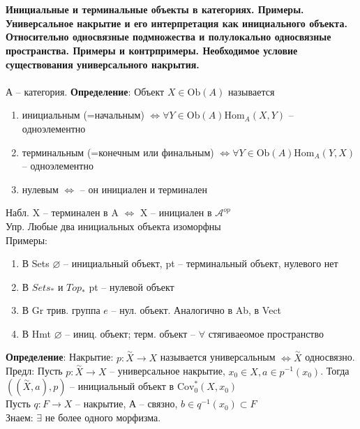 \section{}
	\textbf{Инициальные и терминальные объекты в категориях. Примеры. Универсальное накрытие и его интерпретация как инициального объекта. Относительно односвязные подмножества и полулокально односвязные пространства. Примеры и контрпримеры. Необходимое условие существования универсального накрытия.}\\
	\\
	А -- категория.
	\textbf{Определение}: Объект $X \in \text{Ob}(A)$ называется\\ 
	\begin{enumerate}
	\item инициальным (=начальным) $\Leftrightarrow \forall Y\in \text{Ob}(A) \text{Hom}_{A}(X,Y)$ -- одноэлементно
	\item терминальным (=конечным или финальным) $\Leftrightarrow \forall Y \in \text{Ob}(A) \text{Hom}_{A}(Y,X) $ -- одноэлементно 
	\item нулевым $\Leftrightarrow$ -- он инициален и терминален
	\end{enumerate}
	Набл. X -- терминален в A $\Leftrightarrow$ X -- инициален в $\mathcal A^{op}$\\
	Упр. Любые два инициальных объекта изоморфны\\
	Примеры:
	\begin{enumerate}
	\item В Sets $ \varnothing$ -- инициальный объект, pt -- терминальный объект, нулевого нет
	\item В $Sets_{*}$ и $Top_{*}$ pt -- нулевой объект
	\item В Gr трив. группа ${e}$ -- нул. объект. Аналогично в Ab, в Vect
	\item В Hmt $\varnothing$ -- иниц. объект; терм. объект -- $\forall$ стягиваеомое пространство
	\end{enumerate}
	\textbf{Определение}: Накрытие: $p: \overset{\sim}{X} \rightarrow X$ называется универсальным $\Leftrightarrow \overset{\sim}{X}$ односвязно.\\
	Предл: Пусть $p: \overset{\sim}{X} \rightarrow X$ -- универсальное накрытие, $x_0 \in X, a\in p^{-1}(x_0)$. Тогда $((\overset{\sim}{X}, a), p)$ -- инициальный объект в $\text{Cov}_{0}^{*}(X,x_0)$\\
	Пусть $q: F\rightarrow X$ -- накрытие, А -- связно, $b\in q^{-1}(x_0) \subset F$\\
	Знаем: $\exists$ не более одного морфизма.\\
